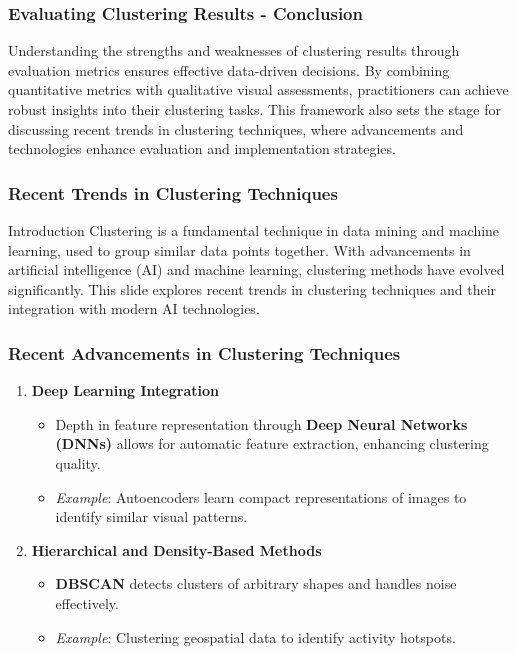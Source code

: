 \documentclass[aspectratio=169]{beamer}
\begin{document}
\begin{frame}[fragile]
    \frametitle{Evaluating Clustering Results - Conclusion}
    Understanding the strengths and weaknesses of clustering results through evaluation metrics ensures effective data-driven decisions. By combining quantitative metrics with qualitative visual assessments, practitioners can achieve robust insights into their clustering tasks. This framework also sets the stage for discussing recent trends in clustering techniques, where advancements and technologies enhance evaluation and implementation strategies.
\end{frame}

\begin{frame}[fragile]
    \frametitle{Recent Trends in Clustering Techniques}
    \begin{block}{Introduction}
        Clustering is a fundamental technique in data mining and machine learning, used to group similar data points together. 
        With advancements in artificial intelligence (AI) and machine learning, clustering methods have evolved significantly. 
        This slide explores recent trends in clustering techniques and their integration with modern AI technologies.
    \end{block}
\end{frame}

\begin{frame}[fragile]
    \frametitle{Recent Advancements in Clustering Techniques}
    \begin{enumerate}
        \item \textbf{Deep Learning Integration}
            \begin{itemize}
                \item Depth in feature representation through \textbf{Deep Neural Networks (DNNs)} allows for automatic feature extraction, enhancing clustering quality.
                \item \textit{Example}: Autoencoders learn compact representations of images to identify similar visual patterns.
            \end{itemize}
        
        \item \textbf{Hierarchical and Density-Based Methods}
            \begin{itemize}
                \item \textbf{DBSCAN} detects clusters of arbitrary shapes and handles noise effectively.
                \item \textit{Example}: Clustering geospatial data to identify activity hotspots.
            \end{itemize}
    \end{enumerate}
\end{frame}
\end{document}
